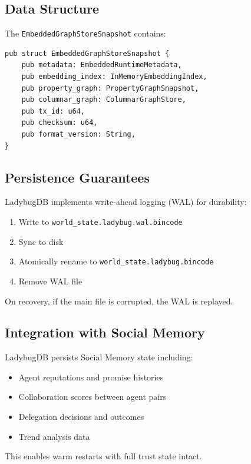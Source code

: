 \documentclass[11pt]{article}
\begin{document}
\subsection{Data Structure}

The \texttt{EmbeddedGraphStoreSnapshot} contains:

\begin{lstlisting}
pub struct EmbeddedGraphStoreSnapshot {
    pub metadata: EmbeddedRuntimeMetadata,
    pub embedding_index: InMemoryEmbeddingIndex,
    pub property_graph: PropertyGraphSnapshot,
    pub columnar_graph: ColumnarGraphStore,
    pub tx_id: u64,
    pub checksum: u64,
    pub format_version: String,
}
\end{lstlisting}

\subsection{Persistence Guarantees}

LadybugDB implements write-ahead logging (WAL) for durability:
\begin{enumerate}[noitemsep,topsep=4pt]
  \item Write to \texttt{world\_state.ladybug.wal.bincode}
  \item Sync to disk
  \item Atomically rename to \texttt{world\_state.ladybug.bincode}
  \item Remove WAL file
\end{enumerate}

On recovery, if the main file is corrupted, the WAL is replayed.

\subsection{Integration with Social Memory}

LadybugDB persists Social Memory state including:
\begin{itemize}[noitemsep,topsep=4pt]
  \item Agent reputations and promise histories
  \item Collaboration scores between agent pairs
  \item Delegation decisions and outcomes
  \item Trend analysis data
\end{itemize}

This enables warm restarts with full trust state intact.

\end{document}
